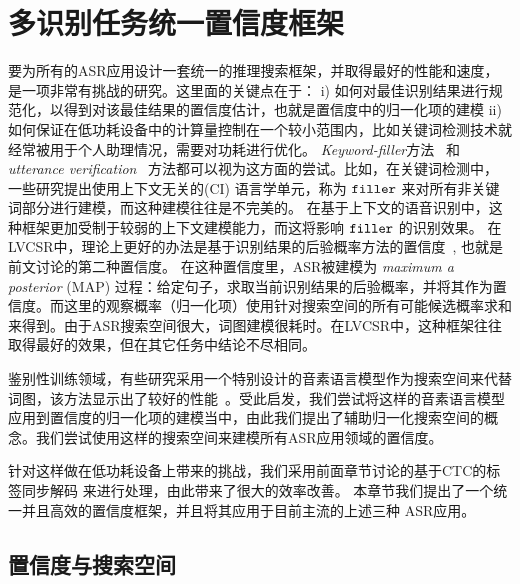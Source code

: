 
\section{多识别任务统一置信度框架}
\label{chap:unify}

要为所有的ASR应用设计一套统一的推理搜索框架，并取得最好的性能和速度，是一项非常有挑战的研究。这里面的关键点在于： i) 如何对最佳识别结果进行规范化，以得到对该最佳结果的置信度估计，也就是置信度中的归一化项的建模
    ii) 如何保证在低功耗设备中的计算量控制在一个较小范围内，比如关键词检测技术就经常被用于个人助理情况，需要对功耗进行优化。
    {\em Keyword-filler}方法~\cite{young1994detecting} 和 {\em utterance verification}~\cite{rose1995training} 方法都可以视为这方面的尝试。比如，在关键词检测中，一些研究提出使用上下文无关的(CI) 语言学单元，称为 $\tt filler$ 来对所有非关键词部分进行建模，而这种建模往往是不完美的。
    在基于上下文的语音识别中，这种框架更加受制于较弱的上下文建模能力，而这将影响 $\tt filler$ 的识别效果。
    在LVCSR中，理论上更好的办法是基于识别结果的后验概率方法的置信度~\cite{wessel2001confidence}, 也就是前文讨论的第二种置信度。 在这种置信度里，ASR被建模为  {\em maximum a posterior} (MAP) 过程：给定句子，求取当前识别结果的后验概率，并将其作为置信度。而这里的观察概率（归一化项）使用针对搜索空间的所有可能候选概率求和来得到。由于ASR搜索空间很大，词图建模很耗时。在LVCSR中，这种框架往往取得最好的效果，但在其它任务中结论不尽相同。

    鉴别性训练领域，有些研究采用一个特别设计的音素语言模型作为搜索空间来代替词图，该方法显示出了较好的性能~\cite{chen2006advances}\cite{povey2016purely}。受此启发，我们尝试将这样的音素语言模型应用到置信度的归一化项的建模当中，由此我们提出了辅助归一化搜索空间的概念。我们尝试使用这样的搜索空间来建模所有ASR应用领域的置信度。 %
    
    针对这样做在低功耗设备上带来的挑战，我们采用前面章节讨论的基于CTC的标签同步解码\cite{Chen+2016} 来进行处理，由此带来了很大的效率改善。
    本章节我们提出了一个统一并且高效的置信度框架，并且将其应用于目前主流的上述三种 ASR应用。



  \subsection{置信度与搜索空间}
  \label{Sec:conf-search-space}

